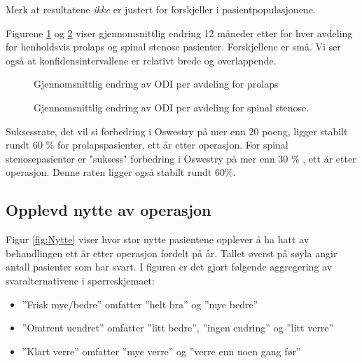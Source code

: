 \documentclass [norsk,a4paper,twoside]{article}\usepackage[]{graphicx}\usepackage[]{color}
\begin{document}
Merk at resultatene \textit{ikke} er justert for forskjeller i pasientpopulasjonene. 




Figurene \ref{fig:OswEndrAvdPro} og \ref{fig:OswEndrAvdSS} viser gjennomsnittlig endring 12 måneder etter for hver avdeling for henholdsvis prolaps og spinal stenose pasienter. Forskjellene er små. Vi ser også at konfidensintervallene er relativt brede og overlappende.

\begin{figure}[h] 
\caption{Gjennomsnittlig endring av ODI per avdeling for prolaps}
\label{fig:OswEndrAvdPro}
\end{figure}

\begin{figure}[h] 
\caption{Gjennomsnittlig endring av ODI per avdeling for spinal stenose.}
\label{fig:OswEndrAvdSS}
\end{figure}




Suksessrate, det vil si forbedring i Oswestry på mer enn 20 poeng, ligger stabilt rundt 60 \% for prolapspasienter, ett år etter operasjon. 
For spinal stenosepasienter er "suksess" forbedring i Oswestry på mer enn 30 \% , ett år etter operasjon. Denne raten ligger også stabilt rundt 60\%.


\clearpage


\subsection{Opplevd nytte av operasjon}

Figur \ref{fig:Nytte} viser hvor stor nytte pasientene opplever å ha hatt av behandlingen ett år etter operasjon fordelt på år. Tallet øverst på søyla angir antall pasienter som har svart. 
I figuren er det gjort følgende aggregering av svaralternativene i spørreskjemaet:
\begin{itemize}
\item ''Frisk mye/bedre'' omfatter ''helt bra'' og ''mye bedre'' 
\item ''Omtrent uendret'' omfatter ''litt bedre'', ''ingen endring'' og ''litt verre'' 
\item ''Klart verre'' omfatter ''mye verre'' og ''verre enn noen gang før''
\end{itemize}
\end{document}
